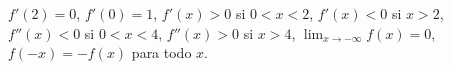 \item $f'(2) = 0$, $f'(0) = 1$, $f'(x) > 0$ si $0 < x < 2$, $f'(x) < 0$ si $x > 2$, $f''(x) < 0$ si $0 < x < 4$, $f''(x) > 0$ si $x > 4$, $\lim_{x \to -\infty} f(x) = 0$, $f(-x) = -f(x)$ para todo $x$.
